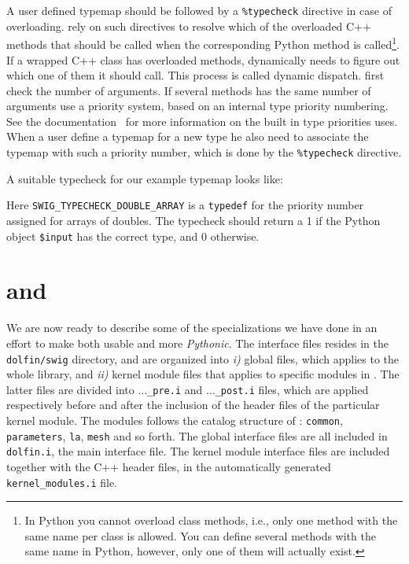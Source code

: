 \begin{code}
A user defined typemap should be followed by a \texttt{\%typecheck} directive
in case of overloading. \swig rely on such directives to resolve which of the overloaded C++ methods that should be
called when the corresponding Python method is called\footnote{In Python you cannot overload class methods, i.e., only one method with the same name per class is allowed. You can define several methods with the same name in Python, however, only one of them will actually exist.}. If a wrapped C++ class has overloaded methods, \swig dynamically needs to figure out which one of them it should call. This process is called dynamic dispatch. \swig first check the number of arguments. If several methods has the same number of arguments \swig use a priority system, based on an internal type priority numbering. See the \swig documentation~\cite{SWIG} for more information on the built in type priorities \swig uses. When a user define a typemap for a new type he also need to associate the typemap with such a priority number, which is done by the \texttt{\%typecheck} directive.\par
A suitable typecheck for our example typemap looks like:
Here \texttt{SWIG\_TYPECHECK\_DOUBLE\_ARRAY} is a \texttt{typedef} for the priority number assigned for arrays of doubles. The typecheck should return a 1 if the Python object \texttt{\$input} has the correct type, and 0 otherwise.\par

\section{\swig and \pydolfin}
We are now ready to describe some of the specializations we have done in an effort to make \pydolfin both usable and more \textit{Pythonic}. The interface files resides in the \texttt{dolfin/swig} directory, and are organized into \textit{i)} global files, which applies to the whole \dolfin library, and \textit{ii)} kernel module files that applies to specific modules in \dolfin. The latter files are divided into \texttt{$\ldots$\_pre.i} and \texttt{$\ldots$\_post.i} files, which are applied respectively before and after the inclusion of the header files of the particular kernel module. The modules follows the catalog structure of \dolfin: \texttt{common}, \texttt{parameters}, \texttt{la}, \texttt{mesh} and so forth. The global interface files are all included in \texttt{dolfin.i}, the main \swig interface file. The kernel module interface files are included together with the C++ header files, in the automatically generated \texttt{kernel\_modules.i} file.\par


\end{code}
